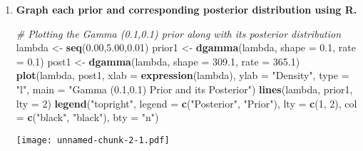 \documentclass[]{article}
\newenvironment{Shaded}{\begin{snugshade}}{\end{snugshade}}
\newcommand{\AttributeTok}[1]{\textcolor[rgb]{0.13,0.29,0.53}{#1}}
\newcommand{\CommentTok}[1]{\textcolor[rgb]{0.56,0.35,0.01}{\textit{#1}}}
\newcommand{\DecValTok}[1]{\textcolor[rgb]{0.00,0.00,0.81}{#1}}
\newcommand{\FloatTok}[1]{\textcolor[rgb]{0.00,0.00,0.81}{#1}}
\newcommand{\FunctionTok}[1]{\textcolor[rgb]{0.13,0.29,0.53}{\textbf{#1}}}
\newcommand{\NormalTok}[1]{#1}
\newcommand{\OtherTok}[1]{\textcolor[rgb]{0.56,0.35,0.01}{#1}}
\newcommand{\StringTok}[1]{\textcolor[rgb]{0.31,0.60,0.02}{#1}}
\begin{document}
\begin{enumerate}
\item \textbf{Graph each prior and corresponding posterior  distribution using R.}

\begin{Shaded}
\begin{Highlighting}[]
\CommentTok{\# Plotting the Gamma (0.1,0.1) prior along with its posterior distribution}
\NormalTok{lambda }\OtherTok{\textless{}{-}} \FunctionTok{seq}\NormalTok{(}\FloatTok{0.00}\NormalTok{,}\FloatTok{5.00}\NormalTok{,}\FloatTok{0.01}\NormalTok{)}
\NormalTok{prior1 }\OtherTok{\textless{}{-}} \FunctionTok{dgamma}\NormalTok{(lambda, }\AttributeTok{shape =} \FloatTok{0.1}\NormalTok{, }\AttributeTok{rate =} \FloatTok{0.1}\NormalTok{)}
\NormalTok{post1 }\OtherTok{\textless{}{-}} \FunctionTok{dgamma}\NormalTok{(lambda, }\AttributeTok{shape =} \FloatTok{309.1}\NormalTok{, }\AttributeTok{rate =} \FloatTok{365.1}\NormalTok{)}
\FunctionTok{plot}\NormalTok{(lambda, post1, }\AttributeTok{xlab =} \FunctionTok{expression}\NormalTok{(lambda), }\AttributeTok{ylab =} \StringTok{"Density"}\NormalTok{, }
     \AttributeTok{type =} \StringTok{"l"}\NormalTok{, }\AttributeTok{main =} \StringTok{"Gamma (0.1,0.1) Prior and its Posterior"}\NormalTok{)}
\FunctionTok{lines}\NormalTok{(lambda, prior1, }\AttributeTok{lty =} \DecValTok{2}\NormalTok{)}
\FunctionTok{legend}\NormalTok{(}\StringTok{"topright"}\NormalTok{, }\AttributeTok{legend =} \FunctionTok{c}\NormalTok{(}\StringTok{"Posterior"}\NormalTok{, }\StringTok{"Prior"}\NormalTok{),  }
       \AttributeTok{lty =} \FunctionTok{c}\NormalTok{(}\DecValTok{1}\NormalTok{, }\DecValTok{2}\NormalTok{),  }
       \AttributeTok{col =} \FunctionTok{c}\NormalTok{(}\StringTok{"black"}\NormalTok{, }\StringTok{"black"}\NormalTok{),  }
       \AttributeTok{bty =} \StringTok{"n"}\NormalTok{) }
\end{Highlighting}
\end{Shaded}

\texttt{[image: unnamed-chunk-2-1.pdf]}


\end{enumerate}
\end{document}

